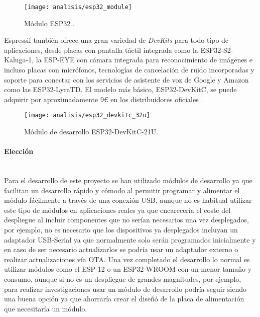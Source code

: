 \documentclass[../proyecto.tex]{subfiles}
\begin{document}
\begin{figure}[H]
\centering
\texttt{[image: analisis/esp32\_module]}
\caption{Módulo ESP32  \cite{esp32_module}.}
\label{fig:esp32_module}
\end{figure}

Espressif también ofrece una gran variedad de \textit{DevKits} para todo tipo de aplicaciones, desde placas con pantalla táctil integrada como la ESP32-S2-Kaluga-1, la ESP-EYE con cámara integrada para reconocimiento de imágenes e incluso placas con micrófonos, tecnologías de cancelación de ruido incorporadas y soporte para conectar con los servicios de asistente de voz de Google y Amazon como las ESP32-LyraTD. El modelo más básico, ESP32-DevKitC, se puede adquirir por aproximadamente 9€ en los distribuidores oficiales \cite{espressif_provider_digikey} \cite{espressif_provider_mouser}.\\

\begin{figure}[H]
\centering
\texttt{[image: analisis/esp32\_devkitc\_32u]}
\caption{Módulo de desarrollo ESP32-DevKitC-21U.}
\label{fig:esp32_devkitc_32u}
\end{figure}

\paragraph{Elección}\mbox{}\\

Para el desarrollo de este proyecto se han utilizado módulos de desarrollo ya que facilitan un desarrollo rápido y cómodo al permitir programar y alimentar el módulo fácilmente a través de una conexión USB, aunque no es habitual utilizar este tipo de módulos en aplicaciones reales ya que encarecería el coste del despliegue al incluir componentes que no serían necesarios una vez desplegados, por ejemplo, no es necesario que los dispositivos ya desplegados incluyan un adaptador USB-Serial ya que normalmente solo serán programados inicialmente y en caso de ser necesario actualizarlos se podría usar un adaptador externo o realizar actualizaciones vía OTA. Una vez completado el desarrollo lo normal es utilizar módulos como el ESP-12 o un ESP32-WROOM con un menor tamaño y consumo, aunque si no es un despliegue de grandes magnitudes, por ejemplo, para realizar investigaciones usar un módulo de desarrollo podría seguir siendo una buena opción ya que ahorraría crear el diseñó de la placa de alimentación que necesitaría un módulo.\\
\end{document}
